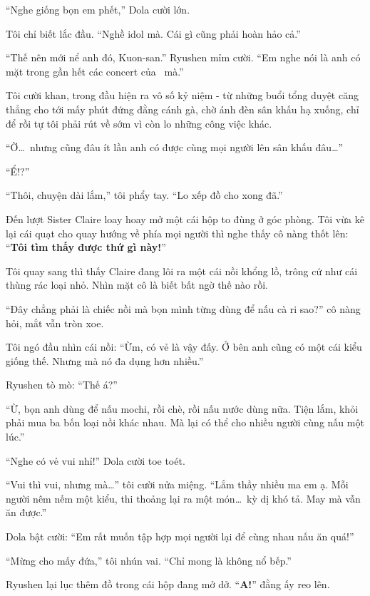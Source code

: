 \documentclass[../main.tex]{subfiles}
\begin{document}
``Nghe giống bọn em phết,'' Dola cười lớn.

Tôi chỉ biết lắc đầu. ``Nghề idol mà. Cái gì cũng phải hoàn hảo cả.''

``Thế nên mới nể anh đó, Kuon-san.'' Ryushen mỉm cười. ``Em nghe nói là anh có mặt trong gần hết các concert của \hll\ mà.''

Tôi cười khan, trong đầu hiện ra vô số kỷ niệm - từ những buổi tổng duyệt căng thẳng cho tới mấy phút đứng đằng cánh gà, chờ ánh đèn sân khấu hạ xuống, chỉ để rồi tự tôi phải rút về sớm vì còn lo những công việc khác.

``Ờ\dots\ nhưng cũng đâu ít lần anh có được cùng mọi người lên sân khấu đâu\dots''

``Ể!?''

``Thôi, chuyện dài lắm,'' tôi phẩy tay. ``Lo xếp đồ cho xong đã.''

\ct

Đến lượt Sister Claire loay hoay mở một cái hộp to đùng ở góc phòng. Tôi vừa kê lại cái quạt cho quay hướng về phía mọi người thì nghe thấy cô nàng thốt lên: ``\textbf{Tôi tìm thấy được thứ gì này!}''

Tôi quay sang thì thấy Claire đang lôi ra một cái nồi khổng lồ, trông cứ như cái thùng rác loại nhỏ. Nhìn mặt cô là biết bất ngờ thế nào rồi.


``Đây chẳng phải là chiếc nồi mà bọn mình từng dùng để nấu cà ri sao?'' cô nàng hỏi, mắt vẫn tròn xoe.

Tôi ngó đầu nhìn cái nồi: ``Ừm, có vẻ là vậy đấy. Ở bên anh cũng có một cái kiểu giống thế. Nhưng mà nó đa dụng hơn nhiều.''

Ryushen tò mò: ``Thế á?''

``Ừ, bọn anh dùng để nấu mochi, rồi chè, rồi nấu nước dùng nữa. Tiện lắm, khỏi phải mua ba bốn loại nồi khác nhau. Mà lại có thể cho nhiều người cùng nấu một lúc.''

``Nghe có vẻ vui nhỉ!'' Dola cười toe toét.

``Vui thì vui, nhưng mà\dots'' tôi cười nửa miệng. ``Lắm thầy nhiều ma em ạ. Mỗi người nêm nếm một kiểu, thi thoảng lại ra một món\dots\ kỳ dị khó tả. May mà vẫn ăn được.''

Dola bật cười: ``Em rất muốn tập hợp mọi người lại để cùng nhau nấu ăn quá!''

``Mừng cho mấy đứa,'' tôi nhún vai. ``Chỉ mong là không nổ bếp.''

\ct

Ryushen lại lục thêm đồ trong cái hộp đang mở dở. ``\textbf{A!}'' đằng ấy reo lên.
\end{document}
